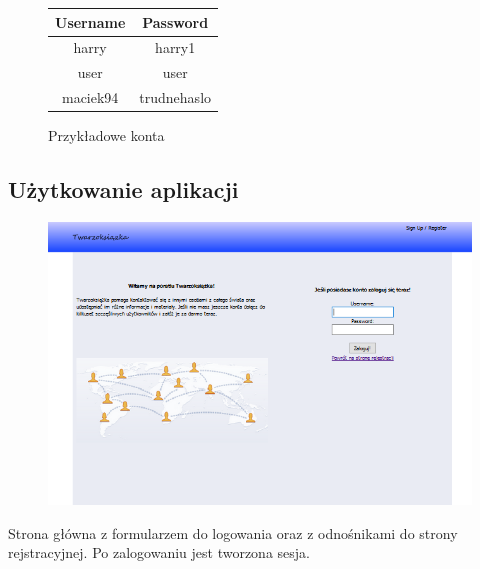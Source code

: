 \documentclass[a4paper,10pt,table]{article}
\begin{document}
\begin{center}
\begin{figure}[h]
\begin{tabular}{|c|c|} 

\hline
\textbf{Username} & \textbf{Password} \\ \hline
harry & harry1 \\ \hline
user & user \\ \hline
maciek94 & trudnehaslo \\ \hline



\end{tabular}
\caption{Przykładowe konta}
\end{figure}
\end{center}
\newpage
\subsection{Użytkowanie aplikacji}
\begin{figure}[h]
\begin{center}
\includegraphics[scale=0.6]{scrn/1}
\end{center}
\end{figure}

Strona główna z formularzem do logowania oraz z odnośnikami do strony rejstracyjnej. Po zalogowaniu jest tworzona sesja. 
\end{document}
